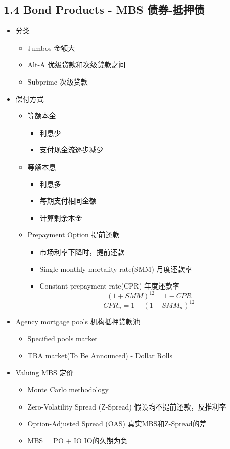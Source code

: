 \documentclass[a4paper,6pt,twoside,openany]{article}
\begin{document}
\subsection*{1.4 Bond Products - MBS 债券-抵押债}
\begin{itemize}
\item 分类
  \begin{itemize}
  \item Jumbos 金额大
  \item Alt-A 优级贷款和次级贷款之间
  \item Subprime 次级贷款
  \end{itemize}
\item 偿付方式
  \begin{itemize}
  \item 等额本金
    \begin{itemize}
    \item 利息少
    \item 支付现金流逐步减少
    \end{itemize}
  \item 等额本息
    \begin{itemize}
    \item 利息多
    \item 每期支付相同金额
    \item 计算剩余本金
    \end{itemize}
  \item Prepayment Option 提前还款
    \begin{itemize}
    \item 市场利率下降时，提前还款
    \item Single monthly mortality rate(SMM) 月度还款率
    \item Constant prepayment rate(CPR) 年度还款率
      $$(1+ SMM)^{12} = 1 - CPR$$
      $$CPR_n = 1 - (1-SMM_n)^{12}$$
    \end{itemize}
  \end{itemize}
  
\item Agency mortgage pools 机构抵押贷款池
  \begin{itemize}
  \item Specified pools market
  \item TBA market(To Be Announced) - Dollar Rolls
  \end{itemize}
   
\item Valuing MBS 定价
  \begin{itemize}
  \item Monte Carlo methodology
  \item Zero-Volatility Spread (Z-Spread) 假设均不提前还款，反推利率
  \item Option-Adjusted Spread (OAS) 真实MBS和Z-Spread的差
  \item MBS = PO + IO  IO的久期为负
  \end{itemize}
\end{itemize}
\end{document}
